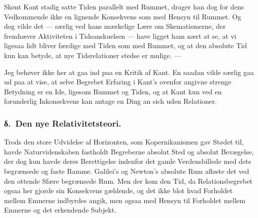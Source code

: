 \documentclass[12pt]{article}
\newcommand{\opage}[1]{\marginnote{\footnotesize\textit{[#1]}}}
\begin{document}
Skønt Kant stadig satte Tiden parallelt med Rummet, drager han dog for dens
Vedkommende ikke en lignende Konsekvens som med Hensyn til Rummet. Og dog
vilde det --- særlig ved hans mærkelige Lære om \guillemotright
Skematismerne\guillemotleft, der fremhæver Aktiviteten i Tidsanskuelsen ---
have ligget ham nært at se, at vi ligesaa lidt bliver færdige med Tiden som
med Rummet, og at den absolute Tid kun kan betyde, at nye Tidsrelationer
stedse er mulige. ---

Jeg behøver ikke her at gaa ind paa en Kritik af Kant. En saadan vilde særlig
gaa ud paa at vise, at selve Begrebet Erfaring i Kant's ovenfor angivne
strenge Betydning er en \guillemotright Ide\guillemotleft, ligesom Rummet og
Tiden, og at Kant kun ved en forunderlig Inkonsekvens kan antage en
\guillemotright Ding an sich\guillemotleft{} uden Relationer.


\opage{72} %
%
\subsubsection*{δ.~Den nye Relativitetsteori.}%
%
\label{sec:3d-delta}%
\noindent
Trods den store Udvidelse af Horizonten, som Kopernikanismen
gav Stødet til, havde Naturvidenskaben fastholdt Begreberne absolut Sted
og absolut Bevægelse, der dog kun havde deres Berettigelse indenfor det
gamle Verdensbillede med dets begrænsede og faste Ramme. Galilei's og
Newton's absolute Rum afløste det ved den ottende Sfære begrænsede Rum.
Men der kom den Tid, da Relationsbegrebet ogsaa her gjorde sin Konsekvens
gældende, og det ikke blot hvad Forholdet mellem Emnerne indbyrdes angik,
men ogsaa med Hensyn til Forholdet mellem Emnerne og det erkendende
Subjekt.
\end{document}
